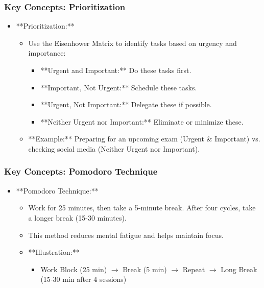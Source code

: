\documentclass[aspectratio=169]{beamer}
\begin{document}
\begin{frame}[fragile]
    \frametitle{Key Concepts: Prioritization}
    \begin{itemize}
        \item **Prioritization:**
        \begin{itemize}
            \item Use the Eisenhower Matrix to identify tasks based on urgency and importance:
            \begin{itemize}
                \item **Urgent and Important:** Do these tasks first.
                \item **Important, Not Urgent:** Schedule these tasks.
                \item **Urgent, Not Important:** Delegate these if possible.
                \item **Neither Urgent nor Important:** Eliminate or minimize these.
            \end{itemize}
            \item **Example:** Preparing for an upcoming exam (Urgent \& Important) vs. checking social media (Neither Urgent nor Important).
        \end{itemize}
    \end{itemize}
\end{frame}

\begin{frame}[fragile]
    \frametitle{Key Concepts: Pomodoro Technique}
    \begin{itemize}
        \item **Pomodoro Technique:**
        \begin{itemize}
            \item Work for 25 minutes, then take a 5-minute break. After four cycles, take a longer break (15-30 minutes).
            \item This method reduces mental fatigue and helps maintain focus.
            \item **Illustration:**
            \begin{itemize}
                \item Work Block (25 min) $\rightarrow$ Break (5 min) $\rightarrow$ Repeat $\rightarrow$ Long Break (15-30 min after 4 sessions)
            \end{itemize}
        \end{itemize}
    \end{itemize}
\end{frame}
\end{document}
